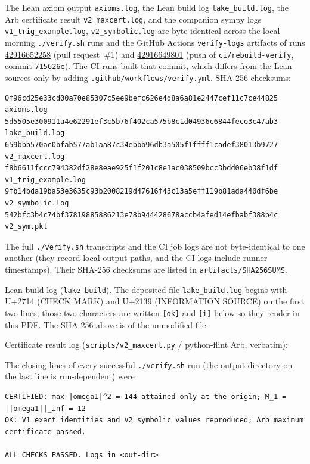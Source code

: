 \documentclass[11pt]{article}
\theoremstyle{remark}
\begin{document}
The Lean axiom output \texttt{axioms.log}, the Lean build log \texttt{lake\_build.log}, the Arb
certificate result \texttt{v2\_maxcert.log}, and the companion sympy logs
\texttt{v1\_trig\_example.log}, \texttt{v2\_symbolic.log} are byte-identical across the local morning
\texttt{./verify.sh} runs and the GitHub Actions \texttt{verify-logs} artifacts of runs
\href{https://github.com/BenFrohman/ns-tether-key-estimate-refutation/actions/runs/42916652258}{42916652258}
(pull request~\#1) and
\href{https://github.com/BenFrohman/ns-tether-key-estimate-refutation/actions/runs/42916649801}{42916649801}
(push of \texttt{ci/rebuild-verify}, commit \texttt{715626e}). The CI runs built that commit, which
differs from the Lean sources only by adding \texttt{.github/workflows/verify.yml}.
SHA-256 checksums:
{\fontsize{6}{7.2}\selectfont
\begin{verbatim}
0f96cd25e33cd00a70e85307c5ee9befc626e4d8a6a81e2447cef11c7ce44825  axioms.log
5d5505e300911a4e62291ef3c5b76f402ca575b8c1d04936c6844fece3c47ab3  lake_build.log
659bbb570ac0bfab577ab1aa87c34ebbb96db3a505f1ffff1cadef38013b9727  v2_maxcert.log
f8b6611fccc794382df28e8eae925f1f201c8e1ac038509bcc3bdd06eb38f1df  v1_trig_example.log
9fb14bda19ba53e3635c93b2008219d47616f43c13a5eff119b81ada440df6be  v2_symbolic.log
542bfc3b4c74bf37819885886213e78b944428678accb4afed14efbabf388b4c  v2_sym.pkl
\end{verbatim}
}
The full \texttt{./verify.sh} transcripts and the CI job logs are not byte-identical to one another
(they record local output paths, and the CI logs include runner timestamps). Their SHA-256
checksums are listed in \texttt{artifacts/SHA256SUMS}.

Lean build log (\texttt{lake build}). The deposited file \texttt{lake\_build.log} begins with
U+2714 (CHECK MARK) and U+2139 (INFORMATION SOURCE) on the first two lines; those two
characters are written \texttt{[ok]} and \texttt{[i]} below so they render in this PDF. The
SHA-256 above is of the unmodified file.
{\fontsize{6.5}{7.5}\selectfont
{}
}

Certificate result log (\texttt{scripts/v2\_maxcert.py} / python-flint Arb, verbatim):
{\fontsize{6.5}{7.5}\selectfont
{}
}

The closing lines of every successful \texttt{./verify.sh} run (the output directory on the last
line is run-dependent) were
{\fontsize{6.5}{7.5}\selectfont
\begin{verbatim}
CERTIFIED: max |omega1|^2 = 144 attained only at the origin; M_1 = ||omega1||_inf = 12
OK: V1 exact identities and V2 symbolic values reproduced; Arb maximum certificate passed.

ALL CHECKS PASSED. Logs in <out-dir>
\end{verbatim}
}
\end{document}
